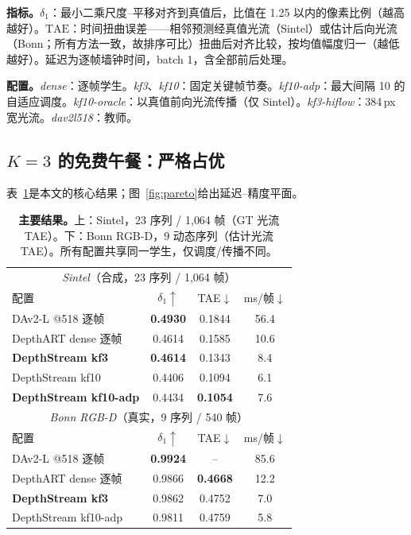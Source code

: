 \documentclass[10pt,twocolumn]{article}
\begin{document}
\textbf{指标。}$\delta_1$：最小二乘尺度--平移对齐到真值后，比值在 1.25 以内的像素比例（越高越好）。$\mathrm{TAE}$：时间扭曲误差——相邻预测经真值光流（Sintel）或估计后向光流（Bonn；所有方法一致，故排序可比）扭曲后对齐比较，按均值幅度归一（越低越好）。延迟为逐帧墙钟时间，batch 1，含全部前后处理。

\textbf{配置。}\emph{dense}：逐帧学生。\emph{kf3}、\emph{kf10}：固定关键帧节奏。\emph{kf10-adp}：最大间隔 10 的自适应调度。\emph{kf10-oracle}：以真值前向光流传播（仅 Sintel）。\emph{kf3-hiflow}：384\,px 宽光流。\emph{dav2l518}：教师。

\subsection{$K{=}3$ 的免费午餐：严格占优}
表~\ref{tab:main}是本文的核心结果；图~\ref{fig:pareto}给出延迟--精度平面。

\begin{table}[t]
\centering\small
\setlength{\tabcolsep}{3.4pt}
\caption{\textbf{主要结果。}上：Sintel，23 序列 / 1{,}064 帧（GT 光流 TAE）。下：Bonn RGB-D，9 动态序列（估计光流 TAE）。所有配置共享同一学生，仅调度/传播不同。}
\label{tab:main}
\begin{tabular}{lccc}
\toprule
\multicolumn{4}{c}{\emph{Sintel}（合成，23 序列 / 1{,}064 帧）}\\
配置 & $\delta_1{\uparrow}$ & TAE$\downarrow$ & ms/帧$\downarrow$\\
\midrule
DAv2-L @518 逐帧 & \textbf{0.4930} & 0.1844 & 56.4\\
DepthART dense 逐帧 & 0.4614 & 0.1585 & 10.6\\
\textbf{DepthStream kf3} & \textbf{0.4614} & 0.1343 & 8.4\\
DepthStream kf10 & 0.4406 & 0.1094 & 6.1\\
\textbf{DepthStream kf10-adp} & 0.4434 & \textbf{0.1054} & 7.6\\
\midrule
\multicolumn{4}{c}{\emph{Bonn RGB-D}（真实，9 序列 / 540 帧）}\\
配置 & $\delta_1{\uparrow}$ & TAE$\downarrow$ & ms/帧$\downarrow$\\
\midrule
DAv2-L @518 逐帧 & \textbf{0.9924} & -- & 85.6\\
DepthART dense 逐帧 & 0.9866 & \textbf{0.4668} & 12.2\\
\textbf{DepthStream kf3} & 0.9862 & 0.4752 & 7.0\\
DepthStream kf10-adp & 0.9811 & 0.4759 & 5.8\\
\bottomrule
\end{tabular}
\end{table}
\end{document}

